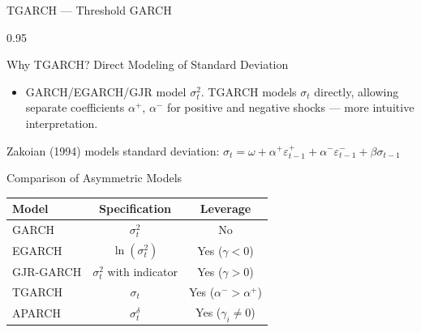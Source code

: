 \documentclass[9pt, aspectratio=169, t]{beamer}
\begin{document}
\begin{frame}{TGARCH --- Threshold GARCH}
    \begin{cminipage}{0.95\textwidth}
    {\footnotesize
    \vspace{-0.2cm}
    \begin{alertblock}{Why TGARCH? Direct Modeling of Standard Deviation}
        \begin{itemize}\setlength{\itemsep}{0pt}
            \item GARCH/EGARCH/GJR model $\sigma_t^2$. TGARCH models $\sigma_t$ directly, allowing separate coefficients $\alpha^+$, $\alpha^-$ for positive and negative shocks --- more intuitive interpretation.
        \end{itemize}
    \end{alertblock}
    \vspace{-0.15cm}
    \begin{defn}[TGARCH(1,1)]
        Zakoian (1994) models standard deviation:
        $\sigma_t = \omega + \alpha^+ \varepsilon_{t-1}^+ + \alpha^- \varepsilon_{t-1}^- + \beta \sigma_{t-1}$
    \end{defn}

    \vspace{0.2cm}

    \begin{block}{Comparison of Asymmetric Models}
        \begin{center}
            \begin{tabular}{lcc}
                \toprule
                \textbf{Model} & \textbf{Specification} & \textbf{Leverage} \\
                \midrule
                GARCH & $\sigma_t^2$ & No \\
                EGARCH & $\ln(\sigma_t^2)$ & Yes ($\gamma < 0$) \\
                GJR-GARCH & $\sigma_t^2$ with indicator & Yes ($\gamma > 0$) \\
                TGARCH & $\sigma_t$ & Yes ($\alpha^- > \alpha^+$) \\
                APARCH & $\sigma_t^\delta$ & Yes ($\gamma_i \neq 0$) \\
                \bottomrule
            \end{tabular}
        \end{center}
    \end{block}
    }
    \end{cminipage}
\end{frame}
\end{document}
